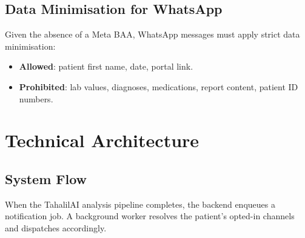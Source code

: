 \documentclass[12pt,a4paper]{article}
\begin{document}
\subsection{Data Minimisation for WhatsApp}

Given the absence of a Meta BAA, WhatsApp messages must apply strict data
minimisation:

\begin{itemize}[leftmargin=2em]
    \item \textbf{Allowed}: patient first name, date, portal link.
    \item \textbf{Prohibited}: lab values, diagnoses, medications, report
          content, patient ID numbers.
\end{itemize}

\section{Technical Architecture}

\subsection{System Flow}

When the TahalilAI analysis pipeline completes, the backend enqueues a
notification job. A background worker resolves the patient's opted-in
channels and dispatches accordingly.
\end{document}

